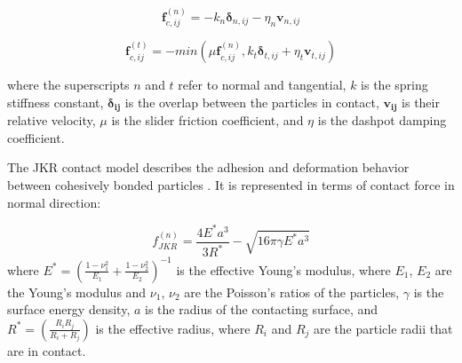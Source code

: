 \documentclass{article}
\begin{document}
\begin{equation}
\bm{f}_{c, ij}^{(n)} = - k_{n} \bm{\delta}_{n, ij} - \eta_n \bm{v}_{n, ij} \label{eq:3}
\end{equation}

\begin{equation}
\bm{f}_{c, ij}^{(t)} = - min \left(\mu \bm{f}_{c, ij}^{(n)}, k_{t} \bm{\delta}_{t, ij} + \eta_t \bm{v}_{t, ij} \right) \label{eq:4}
\end{equation}



where the superscripts $n$ and $t$ refer to normal and tangential, $k$ is the spring stiffness constant, $\bm{\delta_{ij}}$ is the overlap between the particles in contact, $\bm{v_{ij}}$ is their relative velocity, $\mu$ is the slider friction coefficient, and $\eta$ is the dashpot damping coefficient. 


The JKR contact model describes the adhesion and deformation behavior between cohesively bonded particles \citep{johnson1971surface}. It is represented in terms of contact force in normal direction:

\begin{equation}
f^{(n)}_{JKR} = \frac{4E^{*}a^{3}}{3R^{*}}-\sqrt{16\pi\gamma E^{*}a^{3}}\label{eq:12}
\end{equation}
where $E^{*} = \left(\displaystyle \frac{1 - \nu^{2}_{1}}{E_{1}} +\displaystyle \frac{1 - \nu^{2}_{2}}{E_{2}}\right)^{-1}$ is the effective Young's modulus, where  $E_{1}$, $E_{2}$ are the Young's modulus and $\nu_{1}$, $\nu_{2}$ are the Poisson's ratios of the particles, $\gamma$ is the surface energy density, $a$ is the radius of the contacting surface, and $R^{*} = \left(\displaystyle \frac{R_{i}R_{j}}{R_{i}+R_{j}}\right)$ is the effective radius, where  $R_{i}$ and $R_{j}$ are the particle radii that are in contact. 
\end{document}

